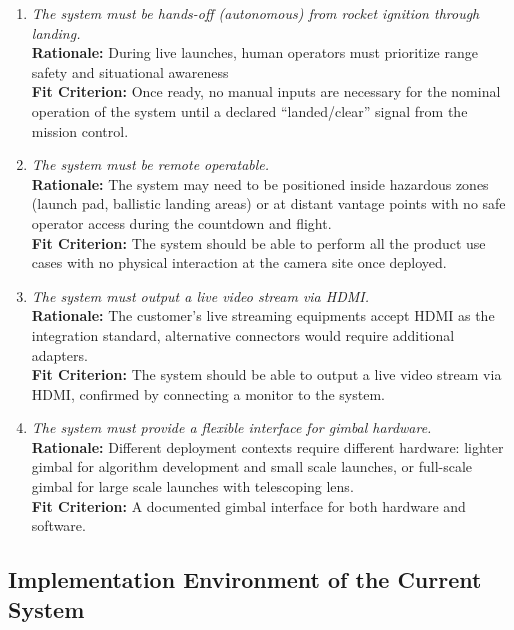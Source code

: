 \documentclass[12pt]{article}
\begin{document}
\begin{enumerate}[label=MD-SL \arabic*., wide=0pt, leftmargin=*]
  \item \emph{The system must be hands-off (autonomous) from rocket ignition through landing.}\\[2mm]
        {\bf Rationale:} During live launches, human operators must prioritize range safety and situational awareness\\
        {\bf Fit Criterion:} Once ready, no manual inputs are necessary for the nominal operation of the system until a declared “landed/clear” signal from the mission control.

  \item \emph{The system must be remote operatable.}\\[2mm]
        {\bf Rationale:} The system may need to be positioned inside hazardous zones (launch pad, ballistic landing areas) or at distant vantage points with no safe operator access during the countdown and flight.\\
        {\bf Fit Criterion:} The system should be able to perform all the product use cases with no physical interaction at the camera site once deployed.

  \item \emph{The system must output a live video stream via HDMI.}\\[2mm]
        {\bf Rationale:} The customer's live streaming equipments accept HDMI as the integration standard, alternative connectors would require additional adapters.\\
        {\bf Fit Criterion:} The system should be able to output a live video stream via HDMI, confirmed by connecting a monitor to the system.

  \item \emph{The system must provide a flexible interface for gimbal hardware.}\\[2mm]
        {\bf Rationale:} Different deployment contexts require different hardware: lighter gimbal for algorithm development and small scale launches, or full-scale gimbal for large scale launches with telescoping lens.\\
        {\bf Fit Criterion:} A documented gimbal interface for both hardware and software.
\end{enumerate}

\subsection{Implementation Environment of the Current System}
\end{document}
